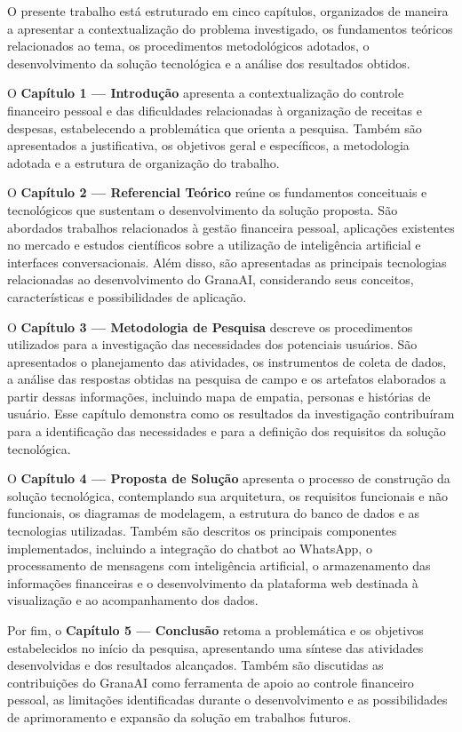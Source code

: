 O presente trabalho está estruturado em cinco capítulos, organizados de maneira a apresentar a contextualização do problema investigado, os fundamentos teóricos relacionados ao tema, os procedimentos metodológicos adotados, o desenvolvimento da solução tecnológica e a análise dos resultados obtidos.

O \textbf{Capítulo 1 — Introdução} apresenta a contextualização do controle financeiro pessoal e das dificuldades relacionadas à organização de receitas e despesas, estabelecendo a problemática que orienta a pesquisa. Também são apresentados a justificativa, os objetivos geral e específicos, a metodologia adotada e a estrutura de organização do trabalho.

O \textbf{Capítulo 2 — Referencial Teórico} reúne os fundamentos conceituais e tecnológicos que sustentam o desenvolvimento da solução proposta. São abordados trabalhos relacionados à gestão financeira pessoal, aplicações existentes no mercado e estudos científicos sobre a utilização de inteligência artificial e interfaces conversacionais. Além disso, são apresentadas as principais tecnologias relacionadas ao desenvolvimento do GranaAI, considerando seus conceitos, características e possibilidades de aplicação.

O \textbf{Capítulo 3 — Metodologia de Pesquisa} descreve os procedimentos utilizados para a investigação das necessidades dos potenciais usuários. São apresentados o planejamento das atividades, os instrumentos de coleta de dados, a análise das respostas obtidas na pesquisa de campo e os artefatos elaborados a partir dessas informações, incluindo mapa de empatia, personas e histórias de usuário. Esse capítulo demonstra como os resultados da investigação contribuíram para a identificação das necessidades e para a definição dos requisitos da solução tecnológica.

O \textbf{Capítulo 4 — Proposta de Solução} apresenta o processo de construção da solução tecnológica, contemplando sua arquitetura, os requisitos funcionais e não funcionais, os diagramas de modelagem, a estrutura do banco de dados e as tecnologias utilizadas. Também são descritos os principais componentes implementados, incluindo a integração do chatbot ao WhatsApp, o processamento de mensagens com inteligência artificial, o armazenamento das informações financeiras e o desenvolvimento da plataforma web destinada à visualização e ao acompanhamento dos dados.

Por fim, o \textbf{Capítulo 5 — Conclusão} retoma a problemática e os objetivos estabelecidos no início da pesquisa, apresentando uma síntese das atividades desenvolvidas e dos resultados alcançados. Também são discutidas as contribuições do GranaAI como ferramenta de apoio ao controle financeiro pessoal, as limitações identificadas durante o desenvolvimento e as possibilidades de aprimoramento e expansão da solução em trabalhos futuros.
